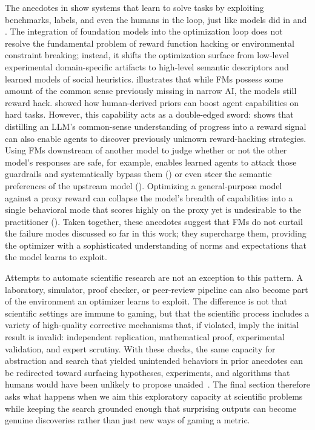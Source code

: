 \documentclass[10pt]{article}
\def\citep#1{}%
\begin{document}
The anecdotes in  show systems that learn to solve tasks by exploiting benchmarks, labels, and even the humans in the loop, just like models did in  and .
The integration of foundation models into the optimization loop does not resolve the fundamental problem of reward function hacking or environmental constraint breaking; instead, it shifts the optimization surface from low-level experimental domain-specific artifacts to high-level semantic descriptors and learned models of social heuristics.
 illustrates that while FMs possess some amount of the common sense previously missing in narrow AI, the models still reward hack. 
 showed how human-derived priors can boost agent capabilities on hard tasks.
However, this capability acts as a double-edged sword:  shows that distilling an LLM's common-sense understanding of progress into a reward signal can also enable agents to discover previously unknown reward-hacking strategies.
Using FMs downstream of another model to judge whether or not the other model's responses are safe, for example, enables learned agents to attack those guardrails and systematically bypass them () or even steer the semantic preferences of the upstream model ().
Optimizing a general-purpose model against a proxy reward can collapse the model's breadth of capabilities into a single behavioral mode that scores highly on the proxy yet is undesirable to the practitioner ().
Taken together, these anecdotes suggest that FMs do not curtail the failure modes discussed so far in this work; they supercharge them, providing the optimizer with a sophisticated understanding of norms and expectations that the model learns to exploit.

Attempts to automate scientific research are not an exception to this pattern. 
A laboratory, simulator, proof checker, or peer-review pipeline can also become part of the environment an optimizer learns to exploit. 
The difference is not that scientific settings are immune to gaming, but that the scientific process includes a variety of high-quality corrective mechanisms that, if violated, imply the initial result is invalid: independent replication, mathematical proof, experimental validation, and expert scrutiny. 
With these checks, the same capacity for abstraction and search that yielded unintended behaviors in prior anecdotes can be redirected toward surfacing hypotheses, experiments, and algorithms that humans would have been unlikely to propose unaided~\citep{alexeev2026primitivesetsvonmangoldt, KrennEntangle2017, novikov2025alphaevolve}. 
The final section therefore asks what happens when we aim this exploratory capacity at scientific problems while keeping the search grounded enough that surprising outputs can become genuine discoveries rather than just new ways of gaming a metric.
\end{document}
